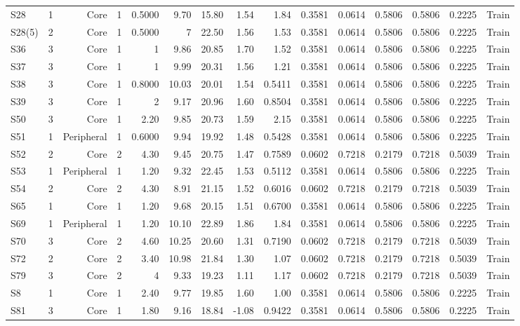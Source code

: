 {\begin{longtable}{lrrrrrrrrrrrrrr}
  S28 & 1 & Core & 1 & 0.5000 & 9.70 & 15.80 & 1.54 & 1.84 & 0.3581 & 0.0614 & 0.5806 & 0.5806 & 0.2225 & Train \\
  S28(5) & 2 & Core & 1 & 0.5000 & 7 & 22.50 & 1.56 & 1.53 & 0.3581 & 0.0614 & 0.5806 & 0.5806 & 0.2225 & Train \\
  S36 & 3 & Core & 1 & 1 & 9.86 & 20.85 & 1.70 & 1.52 & 0.3581 & 0.0614 & 0.5806 & 0.5806 & 0.2225 & Train \\
  S37 & 3 & Core & 1 & 1 & 9.99 & 20.31 & 1.56 & 1.21 & 0.3581 & 0.0614 & 0.5806 & 0.5806 & 0.2225 & Train \\
  S38 & 3 & Core & 1 & 0.8000 & 10.03 & 20.01 & 1.54 & 0.5411 & 0.3581 & 0.0614 & 0.5806 & 0.5806 & 0.2225 & Train \\
  S39 & 3 & Core & 1 & 2 & 9.17 & 20.96 & 1.60 & 0.8504 & 0.3581 & 0.0614 & 0.5806 & 0.5806 & 0.2225 & Train \\
  S50 & 3 & Core & 1 & 2.20 & 9.85 & 20.73 & 1.59 & 2.15 & 0.3581 & 0.0614 & 0.5806 & 0.5806 & 0.2225 & Train \\
  S51 & 1 & Peripheral & 1 & 0.6000 & 9.94 & 19.92 & 1.48 & 0.5428 & 0.3581 & 0.0614 & 0.5806 & 0.5806 & 0.2225 & Train \\
  S52 & 2 & Core & 2 & 4.30 & 9.45 & 20.75 & 1.47 & 0.7589 & 0.0602 & 0.7218 & 0.2179 & 0.7218 & 0.5039 & Train \\
  S53 & 1 & Peripheral & 1 & 1.20 & 9.32 & 22.45 & 1.53 & 0.5112 & 0.3581 & 0.0614 & 0.5806 & 0.5806 & 0.2225 & Train \\
  S54 & 2 & Core & 2 & 4.30 & 8.91 & 21.15 & 1.52 & 0.6016 & 0.0602 & 0.7218 & 0.2179 & 0.7218 & 0.5039 & Train \\
  S65 & 1 & Core & 1 & 1.20 & 9.68 & 20.15 & 1.51 & 0.6700 & 0.3581 & 0.0614 & 0.5806 & 0.5806 & 0.2225 & Train \\
  S69 & 1 & Peripheral & 1 & 1.20 & 10.10 & 22.89 & 1.86 & 1.84 & 0.3581 & 0.0614 & 0.5806 & 0.5806 & 0.2225 & Train \\
  S70 & 3 & Core & 2 & 4.60 & 10.25 & 20.60 & 1.31 & 0.7190 & 0.0602 & 0.7218 & 0.2179 & 0.7218 & 0.5039 & Train \\
  S72 & 2 & Core & 2 & 3.40 & 10.98 & 21.84 & 1.30 & 1.07 & 0.0602 & 0.7218 & 0.2179 & 0.7218 & 0.5039 & Train \\
  S79 & 3 & Core & 2 & 4 & 9.33 & 19.23 & 1.11 & 1.17 & 0.0602 & 0.7218 & 0.2179 & 0.7218 & 0.5039 & Train \\
  S8 & 1 & Core & 1 & 2.40 & 9.77 & 19.85 & 1.60 & 1.00 & 0.3581 & 0.0614 & 0.5806 & 0.5806 & 0.2225 & Train \\
  S81 & 3 & Core & 1 & 1.80 & 9.16 & 18.84 & -1.08 & 0.9422 & 0.3581 & 0.0614 & 0.5806 & 0.5806 & 0.2225 & Train \\
\end{longtable}
}
